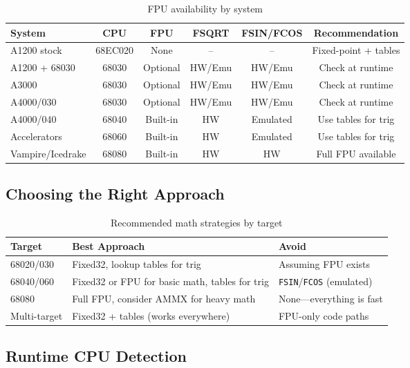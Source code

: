 \begin{table}[h]
\centering
\small
\begin{tabular}{lccccc}
\textbf{System} & \textbf{CPU} & \textbf{FPU} & \textbf{FSQRT} & \textbf{FSIN/FCOS} & \textbf{Recommendation} \\
\hline
A1200 stock & 68EC020 & None & -- & -- & Fixed-point + tables \\
A1200 + 68030 & 68030 & Optional & HW/Emu & HW/Emu & Check at runtime \\
A3000 & 68030 & Optional & HW/Emu & HW/Emu & Check at runtime \\
A4000/030 & 68030 & Optional & HW/Emu & HW/Emu & Check at runtime \\
A4000/040 & 68040 & Built-in & HW & Emulated & Use tables for trig \\
Accelerators & 68060 & Built-in & HW & Emulated & Use tables for trig \\
Vampire/Icedrake & 68080 & Built-in & HW & HW & Full FPU available \\
\end{tabular}
\caption{FPU availability by system}
\end{table}

\subsection{Choosing the Right Approach}

\begin{table}[h]
\centering
\small
\begin{tabular}{lp{5cm}p{5cm}}
\textbf{Target} & \textbf{Best Approach} & \textbf{Avoid} \\
\hline
68020/030 & Fixed32, lookup tables for trig & Assuming FPU exists \\
68040/060 & Fixed32 or FPU for basic math, tables for trig & \texttt{FSIN}/\texttt{FCOS} (emulated) \\
68080 & Full FPU, consider AMMX for heavy math & None---everything is fast \\
Multi-target & Fixed32 + tables (works everywhere) & FPU-only code paths \\
\end{tabular}
\caption{Recommended math strategies by target}
\end{table}

\subsection{Runtime CPU Detection}

